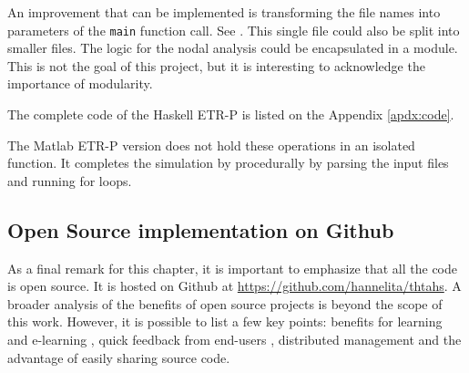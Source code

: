 An improvement that can be implemented is transforming the file names into parameters of the \lstinline!main! function call. See \cite{thtahs}. This single file could also be split into smaller files. The logic for the nodal analysis could be encapsulated in a module. This is not the goal of this project, but it is interesting to acknowledge the importance of modularity.

The complete code of the Haskell ETR-P is listed on the Appendix \ref{apdx:code}.

The Matlab ETR-P version does not hold these operations in an isolated function. It completes the simulation by procedurally by parsing the input files and running for loops.

\subsection{ Open Source implementation on Github }

As a final remark for this chapter, it is important to emphasize that all the code is open source. It is hosted on Github at \url{https://github.com/hannelita/thtahs}. A broader analysis of the benefits of open source projects is beyond the scope of this work. However, it is possible to list a few key points: benefits for learning and e-learning \cite{koohang2005open}, quick feedback from end-users \cite{watson2008business}, distributed management \cite{lerner2001open} and the advantage of easily sharing source code.































